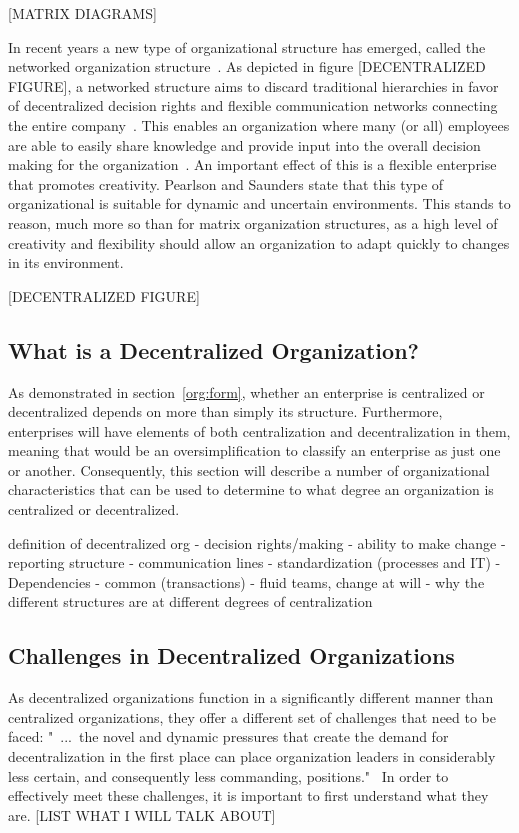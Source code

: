 [MATRIX DIAGRAMS]

In recent years a new type of organizational structure has emerged, called the networked organization structure~\cite{pearlson2009}. As depicted in figure [DECENTRALIZED FIGURE], a networked structure aims to discard traditional hierarchies in favor of decentralized decision rights and flexible communication networks connecting the entire company~\cite{applegate1988,pearlson2009}. This enables an organization where many (or all) employees are able to easily share knowledge and provide input into the overall decision making for the organization~\cite{pearlson2009}. An important effect of this is a flexible enterprise that promotes creativity. Pearlson and Saunders state that this type of organizational is suitable for dynamic and uncertain environments. This stands to reason, much more so than for matrix  organization structures, as a high level of creativity and flexibility should allow an organization to adapt quickly to changes in its environment. 

[DECENTRALIZED FIGURE]

\subsection{What is a Decentralized Organization?}

As demonstrated in section~\ref{org:form}, whether an enterprise is centralized or decentralized depends on more than simply its structure. Furthermore, enterprises will have elements of both centralization and decentralization in them, meaning that would be an oversimplification to classify an enterprise as just one or another. Consequently, this section will describe a number of organizational characteristics that can be used to determine to what degree an organization is centralized or decentralized. 


definition of decentralized org
    - decision rights/making
        - ability to make change
    - reporting structure
    - communication lines
    - standardization (processes and IT)
    - Dependencies - common (transactions)
    - fluid teams, change at will
    - why the different structures are at different degrees of centralization
    

\subsection{Challenges in Decentralized Organizations}

As decentralized organizations function in a significantly different manner than centralized organizations, they offer a different set of challenges that need to be faced: "~...~the novel and dynamic pressures that create the demand for decentralization in the first place can place organization leaders in considerably less certain, and consequently less commanding, positions."~\cite{caruso2008boundaries} In order to effectively meet these challenges, it is important to first understand what they are. [LIST WHAT I WILL TALK ABOUT]

